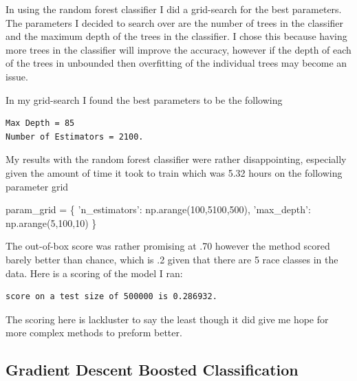 \documentclass[11pt]{article}
\newenvironment{Shaded}{}{}
\newcommand{\DecValTok}[1]{\textcolor[rgb]{0.25,0.63,0.44}{{#1}}}
\newcommand{\StringTok}[1]{\textcolor[rgb]{0.25,0.44,0.63}{{#1}}}
\newcommand{\NormalTok}[1]{{#1}}
\newcommand{\OperatorTok}[1]{\textcolor[rgb]{0.40,0.40,0.40}{{#1}}}
\begin{document}
In using the random forest classifier I did a grid-search for the best
parameters. The parameters I decided to search over are the number of
trees in the classifier and the maximum depth of the trees in the
classifier. I chose this because having more trees in the classifier
will improve the accuracy, however if the depth of each of the trees in
unbounded then overfitting of the individual trees may become an issue.

In my grid-search I found the best parameters to be the following

    \begin{Verbatim}[commandchars=\\\{\}]
Max Depth = 85
Number of Estimators = 2100.
    \end{Verbatim}

    My results with the random forest classifier were rather disappointing,
especially given the amount of time it took to train which was 5.32
hours on the following parameter grid

\begin{Shaded}
\begin{Highlighting}[]
\NormalTok{param_grid }\OperatorTok{=}\NormalTok{ \{}
    \StringTok{'n_estimators'}\NormalTok{: np.arange(}\DecValTok{100}\NormalTok{,}\DecValTok{5100}\NormalTok{,}\DecValTok{500}\NormalTok{),}
    \StringTok{'max_depth'}\NormalTok{: np.arange(}\DecValTok{5}\NormalTok{,}\DecValTok{100}\NormalTok{,}\DecValTok{10}\NormalTok{)}
\NormalTok{\}}
\end{Highlighting}
\end{Shaded}

The out-of-box score was rather promising at .70 however the method
scored barely better than chance, which is .2 given that there are 5 race classes in the data. Here is a scoring of the model I ran:

    \begin{Verbatim}[commandchars=\\\{\}]
score on a test size of 500000 is 0.286932.
    \end{Verbatim}

    The scoring here is lackluster to say the least though it did give me
hope for more complex methods to preform better.

\hypertarget{gradient-descent-boosted-classification}{%
\subsection{Gradient Descent Boosted
Classification}\label{gradient-descent-boosted-classification}}
\end{document}
